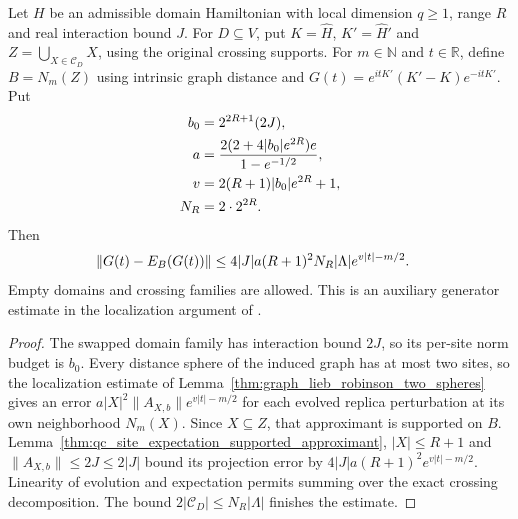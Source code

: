 \begin{lemma}
    \label{thm:domain_relative_generator_localization}
    \leanok
    Let $H$ be an admissible domain Hamiltonian with local dimension $q\ge1$,
    range $R$ and real interaction bound $J$. For $D\subseteq V$, put
    $K=\widehat H$, $K'=\widehat H'$ and
    $Z=\bigcup_{X\in\mathcal C_D}X$, using the original crossing supports.
    For $m\in\mathbb N$ and $t\in\mathbb R$, define
    $B=N_m(Z)$ using intrinsic graph distance and
    $G(t)=e^{itK'}(K'-K)e^{-itK'}$. Put
    \begin{align}
        b_0 & =2^{2R+1}(2J),\notag                          \\
        a   & =\frac{2(2+4|b_0|e^{2R})e}{1-e^{-1/2}},\notag \\
        v   & =2(R+1)|b_0|e^{2R}+1,\notag                   \\
        N_R & =2\cdot2^{2R}.\notag
    \end{align}
    Then
    \begin{align}
        \|G(t)-E_B(G(t))\|
         & \le4|J|a(R+1)^2N_R|\Lambda|e^{v|t|-m/2}.\notag
    \end{align}
    Empty domains and crossing families are allowed. This is an auxiliary
    generator estimate in the localization argument of
    \cite[Part~IIa]{TNLean2026OneDimensional}.
\end{lemma}
\begin{proof}\leanok
    The swapped domain family has interaction bound $2J$, so its per-site
    norm budget is $b_0$. Every distance sphere of the induced graph has at most
    two sites, so the localization estimate of
    Lemma~\ref{thm:graph_lieb_robinson_two_spheres} gives an error
    $a|X|^2\|A_{X,b}\|e^{v|t|-m/2}$ for each evolved replica perturbation
    at its own neighborhood $N_m(X)$.
    Since $X\subseteq Z$, that approximant is supported on $B$.
    Lemma~\ref{thm:qc_site_expectation_supported_approximant},
    $|X|\le R+1$ and $\|A_{X,b}\|\le2J\le2|J|$ bound its projection error by
    $4|J|a(R+1)^2e^{v|t|-m/2}$.
    Linearity of evolution and expectation permits summing over the exact
    crossing decomposition. The bound
    $2|\mathcal C_D|\le N_R|\Lambda|$ finishes the estimate.
\end{proof}

